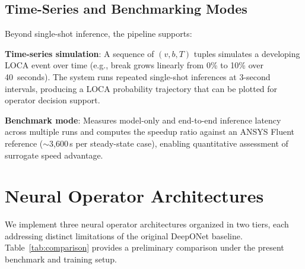 \documentclass[conference]{IEEEtran}
\begin{document}
\subsection{Time-Series and Benchmarking Modes}

Beyond single-shot inference, the pipeline supports:

\textbf{Time-series simulation}: A sequence of $(v, b, T)$ tuples simulates a developing LOCA event over time (e.g., break grows linearly from 0\% to 10\% over 40~seconds). The system runs repeated single-shot inferences at 3-second intervals, producing a LOCA probability trajectory that can be plotted for operator decision support.

\textbf{Benchmark mode}: Measures model-only and end-to-end inference latency across multiple runs and computes the speedup ratio against an ANSYS Fluent reference ($\sim$3,600\,s per steady-state case), enabling quantitative assessment of surrogate speed advantage.

\section{Neural Operator Architectures}
\label{sec:architectures}

We implement three neural operator architectures organized in two tiers, each addressing distinct limitations of the original DeepONet baseline.
Table~\ref{tab:comparison} provides a preliminary comparison under the present benchmark and training setup.
\end{document}
